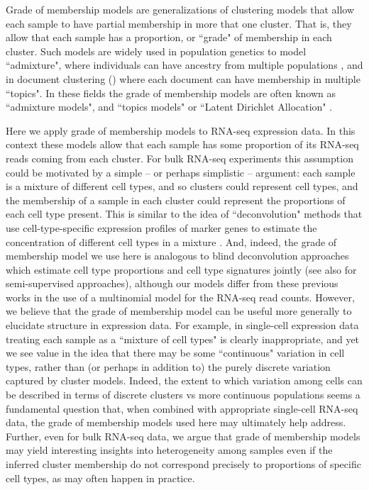 Grade of membership models are generalizations of clustering models that allow each sample to have partial membership in more that one cluster.
That is, they allow that each sample has a proportion, or ``grade" of membership in each cluster. Such
models are widely used in population genetics to model ``admixture", where individuals can have ancestry from multiple populations \cite{Pritchard2000,admixturepaper},
and in document clustering (\cite{Blei2003,Blei2009}) where each document can have membership in multiple ``topics". In these fields
the grade of membership models are often known as ``admixture models", and ``topics models" or ``Latent Dirichlet Allocation" \cite{Blei2003}.

Here we apply grade of membership models to RNA-seq expression data. In this context these models allow that each
 sample has some proportion of its RNA-seq reads coming from each cluster. For bulk RNA-seq experiments this assumption 
could be motivated by a simple -- or perhaps simplistic -- argument: each sample is a mixture of different cell types, and so clusters 
could represent cell types, and the membership of a sample in each cluster could represent the proportions of each cell type present.
This is similar to the idea of ``deconvolution" methods that use cell-type-specific expression profiles of marker genes to estimate the concentration of different cell types in a mixture \cite{}. And, indeed, the grade of membership model we use here is analogous to blind deconvolution approaches \cite{Schwartz2010,Repsilber2010}
 which estimate cell type proportions and cell type signatures jointly (see also \cite{Shen-Orr2010,Qiao2012} for semi-supervised approaches), although 
 our models differ from these previous works in the use of a multinomial model for the RNA-seq read counts. 
However, we believe that the grade of membership model can be useful more generally to elucidate structure in expression data.
For example, in single-cell expression data treating each sample as a ``mixture of cell types" is clearly inappropriate, and yet we see value in the idea
that there may be some ``continuous" variation in cell types, rather than (or perhaps in addition to) the purely discrete variation captured by cluster models. 
Indeed, the extent to which variation among cells can be described in terms of discrete clusters vs more continuous populations
seems a fundamental question that, when combined with appropriate single-cell RNA-seq data, the grade of membership models used here may
ultimately help address. Further, even for bulk RNA-seq data, we argue that grade of membership models may yield interesting insights into heterogeneity among samples
even if the inferred cluster membership do not correspond precisely to proportions of specific cell types, as may often happen in practice.

